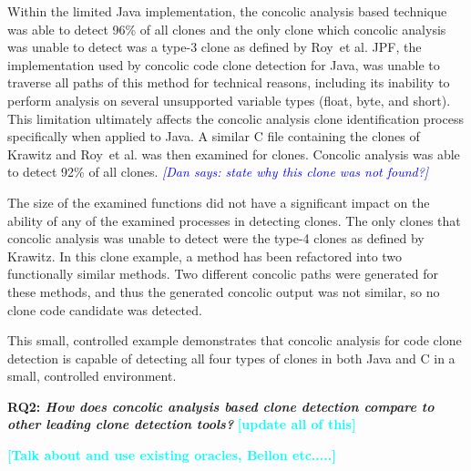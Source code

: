 \documentclass[smallextended]{svjour3}       %
\newcommand{\todo}[1]{\textcolor{cyan}{\textbf{[#1]}}}
\newcommand{\dan}[1]{\textcolor{blue}{{\it [Dan says: #1]}}}
\begin{document}
Within the limited Java implementation, the concolic analysis based technique was able to detect 96\% of all clones and the only clone which concolic analysis was unable to detect was a type-3 clone as defined by Roy~et al. JPF, the implementation used by concolic code clone detection for Java, was unable to traverse all paths of this method for technical reasons, including its inability to perform analysis on several unsupported variable types (float, byte, and short). This limitation ultimately affects the concolic analysis clone identification process specifically when applied to Java. A similar C file containing the clones of Krawitz and Roy~et al. was then examined for clones. Concolic analysis was able to detect 92\% of all clones. \dan{state why this clone was not found?}

The size of the examined functions did not have a significant impact on the ability of any of the examined processes in detecting clones. The only clones that concolic analysis was unable to detect were the type-4 clones as defined by Krawitz. In this clone example, a method has been refactored into two functionally similar methods. Two different concolic paths were generated for these methods, and thus the generated concolic output was not similar, so no clone code candidate was detected.

This small, controlled example demonstrates that concolic analysis for code clone detection is capable of detecting all four types of clones in both Java and C in a small, controlled environment.


\textbf{RQ2: \emph{How does concolic analysis based clone detection compare to other leading clone detection tools?}}
\todo{update all of this}

\todo{Talk about and use existing oracles, Bellon etc.....}

\end{document}
